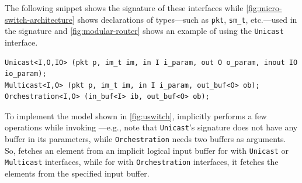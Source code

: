 \documentclass[letterpaper,twocolumn,10pt]{article}
\begin{document}
The following snippet shows the signature of these interfaces while
\cref{fig:micro-switch-architecture} shows declarations of
types---such as \texttt{pkt}, \texttt{sm\_t}, etc.---used in the
signature and \cref{fig:modular-router} shows an example of using the
\texttt{Unicast} interface.

\begin{lstlisting}[frame=none]
Unicast<I,O,IO> (pkt p, im_t im, in I i_param, out O o_param, inout IO io_param);
Multicast<I,O> (pkt p, im_t im, in I i_param, out_buf<O> ob);
Orchestration<I,O> (in_buf<I> ib, out_buf<O> ob);
\end{lstlisting}

To implement the model shown in \cref{fig:uswitch}, \uswitch
implicitly performs a few operations while invoking 
\uprograms---e.g., note that \texttt{Unicast}'s signature does not 
have any
buffer in its parameters, while \texttt{Orchestration} needs two
buffers as arguments. So, \uswitch fetches an element from an implicit
logical input buffer for \uprograms with \texttt{Unicast} or
\texttt{Multicast} interfaces, while for \uprograms with
\texttt{Orchestration} interfaces, it fetches the elements from the
specified input buffer.


\end{document}
